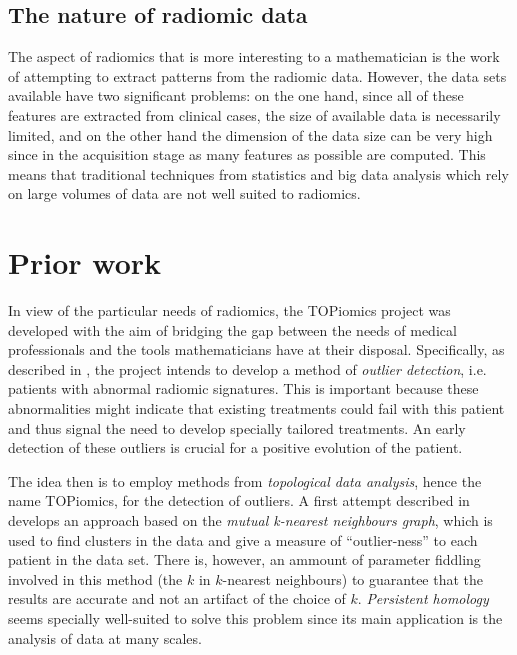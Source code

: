 \documentclass[../main.tex]{subfiles}
\begin{document}
\subsection{The nature of radiomic data}
The aspect of radiomics that is more interesting to a mathematician is the work of
attempting to extract patterns from the radiomic data. However, the data sets available
have two significant problems: on the one hand, since all of these features are extracted
from clinical cases, the size of available data is necessarily limited, and on the other
hand the dimension of the data size can be very high since in the acquisition stage as
many features as possible are computed. This means that traditional techniques from
statistics and big data analysis which rely on large volumes of data are not well suited
to radiomics.

\section{Prior work} \label{sec:prior work}
In view of the particular needs of radiomics, the TOPiomics project was developed with the
aim of bridging the gap between the needs of medical professionals and the tools
mathematicians have at their disposal. Specifically, as described in \cite{topiomics,
attract}, the project intends to develop a method of \emph{outlier detection}, i.e.
patients with abnormal radiomic signatures. This is important because these abnormalities
might indicate that existing treatments could fail with this patient and thus signal the
need to develop specially tailored treatments. An early detection of these outliers is
crucial for a positive evolution of the patient. 

The idea then is to employ methods from \emph{topological data analysis}, hence the name
TOPiomics, for the detection of outliers. A first attempt described in \cite{outliers}
develops an approach based on the \emph{mutual k-nearest neighbours graph}, which is used
to find clusters in the data and give a measure of ``outlier-ness'' to each patient in the
data set. There is, however, an ammount of parameter fiddling involved in this method (the
\( k \) in \( k \)-nearest neighbours) to guarantee that the results are accurate and not
an artifact of the choice of \( k \). \emph{Persistent homology} seems specially
well-suited to solve this problem since its main application is the analysis of data at
many scales. 
\end{document}
